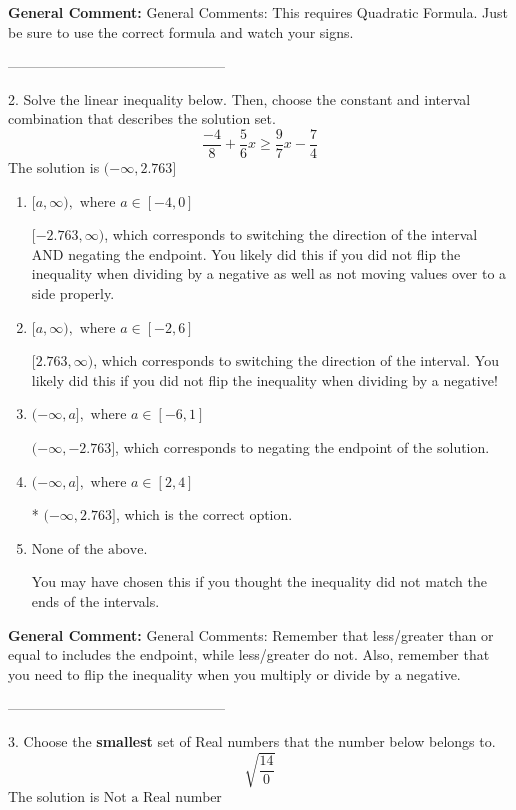 \documentclass{extbook}[14pt]
\begin{document}
\textbf{General Comment:} General Comments: This requires Quadratic Formula. Just be sure to use the correct formula and watch your signs. 

-----------------------------------------------

2. Solve the linear inequality below. Then, choose the constant and interval combination that describes the solution set.
\[ \frac{-4}{8} + \frac{5}{6} x \geq \frac{9}{7} x - \frac{7}{4} \] 
The solution is $ (-\infty, 2.763] $ 

\begin{enumerate}[label=\Alph*.] 
\item $ [a, \infty), \text{ where } a \in [-4, 0] $ 

  $[-2.763, \infty)$, which corresponds to switching the direction of the interval AND negating the endpoint. You likely did this if you did not flip the inequality when dividing by a negative as well as not moving values over to a side properly. 
\item $ [a, \infty), \text{ where } a \in [-2, 6] $ 

  $[2.763, \infty)$, which corresponds to switching the direction of the interval. You likely did this if you did not flip the inequality when dividing by a negative! 
\item $ (-\infty, a], \text{ where } a \in [-6, 1] $ 

  $(-\infty, -2.763]$, which corresponds to negating the endpoint of the solution. 
\item $ (-\infty, a], \text{ where } a \in [2, 4] $ 

 * $(-\infty, 2.763]$, which is the correct option. 
\item $ \text{None of the above}. $ 

 You may have chosen this if you thought the inequality did not match the ends of the intervals. 
\end{enumerate} 
 
\textbf{General Comment:} General Comments: Remember that less/greater than or equal to includes the endpoint, while less/greater do not. Also, remember that you need to flip the inequality when you multiply or divide by a negative. 

-----------------------------------------------

3. Choose the \textbf{smallest} set of Real numbers that the number below belongs to.
\[ \sqrt{\frac{14}{0}} \] 
The solution is $ \text{Not a Real number} $ 
\end{document}
